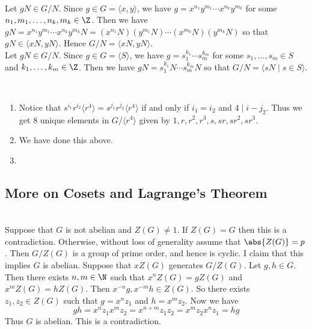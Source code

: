 \documentclass[a4paper]{article}
\begin{document}
\begin{ex}{}{}
\end{ex} 

\begin{ex}{}{}\\
Let $gN\in G/N$. Since $g\in G=\langle x,y\rangle$, we have $g=x^{n_1}y^{m_1}\cdots x^{n_k}y^{m_k}$ for some $n_1,m_1,\dots,n_k,m_k\in\Z$. Then we have $gN=x^{n_1}y^{m_1}\cdots x^{n_k}y^{m_k}N=(x^{n_1}N)(y^{m_1}N)\cdots(x^{m_k}N)(y^{m_k}N)$ so that $gN\in\langle xN,yN\rangle$. Hence $G/N=\langle xN,yN\rangle$. \\

Let $gN\in G/N$. Since $g\in G=\langle S\rangle$, we have $g=s_1^{k_1}\cdots s_m^{k_m}$ for some $s_1,\dots,s_m\in S$ and $k_1,\dots,k_m\in\Z$. Then we have $gN=s_1^{k_1}N\cdots s_m^{k_m}N$ so that $G/N=\langle sN\;|\;s\in S\rangle$. 
\end{ex} 

\begin{ex}{}{}\\
\begin{enumerate}[label=(\alph*)]
\item Notice that $s^{i_1}r^{i_2}\langle r^4\rangle=s^{j_1}r^{j_2}\langle r^4\rangle$ if and only if $i_1=i_2$ and $4\;|\;i-j_2$. Thus we get $8$ unique elements in $G/\langle r^4\rangle$ given by $1,r,r^2,r^3,s,sr,sr^2,sr^3$. 
\item We have done this above. 
\item 
\end{enumerate}
\end{ex}

\subsection{More on Cosets and Lagrange's Theorem}
\begin{ex}{}{}
\end{ex} 

\begin{ex}{}{}
\end{ex} 

\begin{ex}{}{}
\end{ex} 

\begin{ex}{}{}\\
Suppose that $G$ is not abelian and $Z(G)\neq 1$. If $Z(G)=G$ then this is a contradiction. Otherwise, without loss of generality assume that $\abs{Z(G)}=p$. Then $G/Z(G)$ is a group of prime order, and hence is cyclic. I claim that this implies $G$ is abelian. Suppose that $xZ(G)$ generates $G/Z(G)$. Let $g,h\in G$. Then there exists $n,m\in\N$ such that $x^nZ(G)=gZ(G)$ and $x^mZ(G)=hZ(G)$. Then $x^{-n}g,x^{-m}h\in Z(G)$. So there exists $z_1,z_2\in Z(G)$ such that $g=x^nz_1$ and $h=x^mz_2$. Now we have $$gh=x^nz_1x^mz_2=x^{n+m}z_1z_2=x^mz_2x^nz_1=hg$$ Thus $G$ is abelian. This is a contradiction. 
\end{ex}
\end{document}
